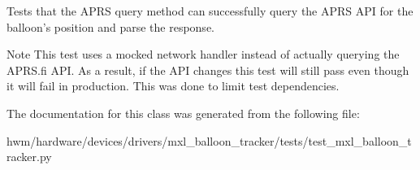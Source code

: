 Tests that the A\-P\-R\-S query method can successfully query the A\-P\-R\-S A\-P\-I for the balloon's position and parse the response. 

\begin{DoxyNote}{Note}
This test uses a mocked network handler instead of actually querying the A\-P\-R\-S.\-fi A\-P\-I. As a result, if the A\-P\-I changes this test will still pass even though it will fail in production. This was done to limit test dependencies. 
\end{DoxyNote}


The documentation for this class was generated from the following file\-:\begin{DoxyCompactItemize}
\item 
hwm/hardware/devices/drivers/mxl\-\_\-balloon\-\_\-tracker/tests/test\-\_\-mxl\-\_\-balloon\-\_\-tracker.\-py\end{DoxyCompactItemize}
